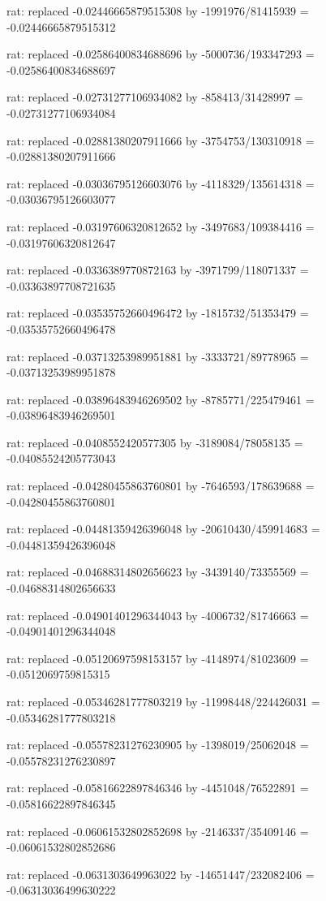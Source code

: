 \documentclass[a4paper,10pt]{article}
\begin{document}
\begin{eulernotebook}
\begin{eulercomment}
\begin{eulercomment}
\begin{eulercomment}
\begin{eulercomment}
\begin{eulercomment}
\begin{eulercomment}
\begin{eulercomment}
\begin{eulercomment}
\begin{eulercomment}
\begin{eulercomment}
\begin{eulercomment}
\begin{eulercomment}
\begin{eulercomment}
\begin{eulercomment}
\begin{eulercomment}
\begin{eulercomment}
\begin{euleroutput}
  rat: replaced -0.02446665879515308 by -1991976/81415939 = -0.02446665879515312
  
  rat: replaced -0.02586400834688696 by -5000736/193347293 = -0.02586400834688697
  
  rat: replaced -0.02731277106934082 by -858413/31428997 = -0.02731277106934084
  
  rat: replaced -0.02881380207911666 by -3754753/130310918 = -0.02881380207911666
  
  rat: replaced -0.03036795126603076 by -4118329/135614318 = -0.03036795126603077
  
  rat: replaced -0.03197606320812652 by -3497683/109384416 = -0.03197606320812647
  
  rat: replaced -0.0336389770872163 by -3971799/118071337 = -0.03363897708721635
  
  rat: replaced -0.03535752660496472 by -1815732/51353479 = -0.03535752660496478
  
  rat: replaced -0.03713253989951881 by -3333721/89778965 = -0.03713253989951878
  
  rat: replaced -0.03896483946269502 by -8785771/225479461 = -0.03896483946269501
  
  rat: replaced -0.0408552420577305 by -3189084/78058135 = -0.04085524205773043
  
  rat: replaced -0.04280455863760801 by -7646593/178639688 = -0.04280455863760801
  
  rat: replaced -0.04481359426396048 by -20610430/459914683 = -0.04481359426396048
  
  rat: replaced -0.04688314802656623 by -3439140/73355569 = -0.04688314802656633
  
  rat: replaced -0.04901401296344043 by -4006732/81746663 = -0.04901401296344048
  
  rat: replaced -0.05120697598153157 by -4148974/81023609 = -0.0512069759815315
  
  rat: replaced -0.05346281777803219 by -11998448/224426031 = -0.05346281777803218
  
  rat: replaced -0.05578231276230905 by -1398019/25062048 = -0.05578231276230897
  
  rat: replaced -0.05816622897846346 by -4451048/76522891 = -0.05816622897846345
  
  rat: replaced -0.06061532802852698 by -2146337/35409146 = -0.06061532802852686
  
  rat: replaced -0.0631303649963022 by -14651447/232082406 = -0.06313036499630222
  

\end{euleroutput}
\end{eulercomment}
\end{eulercomment}
\end{eulercomment}
\end{eulercomment}
\end{eulercomment}
\end{eulercomment}
\end{eulercomment}
\end{eulercomment}
\end{eulercomment}
\end{eulercomment}
\end{eulercomment}
\end{eulercomment}
\end{eulercomment}
\end{eulercomment}
\end{eulercomment}
\end{eulercomment}
\end{eulernotebook}
\end{document}
